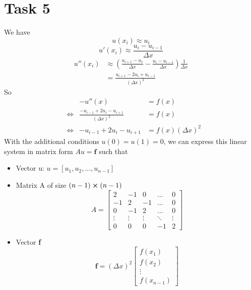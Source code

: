 \documentclass{article}
\begin{document}
\section{Task 5}
We have
$$
u(x_i) \approx u_i
$$
$$
u'(x_i) \approx \frac{u_i-u_{i-1}}{\Delta x}
$$
\begin{equation*}
    \begin{aligned}
        u''(x_i) &\approx \left(\frac{u_{i+1}-u_1}{\Delta x} - \frac{u_i-u_{i-1}}{\Delta x}\right) \frac{1}{\Delta x} \\
        &= \frac{u_{i+1}-2u_i+u_{i-1}}{(\Delta x)^2} 
    \end{aligned}
\end{equation*}
So
\begin{equation*}
    \begin{aligned}
    & &-u''(x) &= f(x) \\
    &\iff &\frac{-u_{i-1}+2u_i-u_{i+1}}{(\Delta x)^2} &= f(x) \\
    &\iff &-u_{i-1}+2u_i-u_{i+1} &= f(x)(\Delta x)^2
    \end{aligned}
\end{equation*}
With the additional conditions $u(0) = u(1) = 0$, we can express this linear system in matrix form $Au = \textbf{f}$ such that
\begin{itemize}
    \item Vector u: $u=[u_1,u_2,...,u_{n-1}]$
    \item Matrix A of size $(n-1)\cross (n-1)$
        \begin{equation*}
            A =
            \begin{bmatrix}
                2 & -1 & 0 & \dots & 0 \\
                -1 & 2 & -1 & \dots & 0 \\
                0 & -1 & 2 & \dots & 0 \\
                \vdots & \vdots & \vdots & \ddots & \vdots \\
                0 & 0 & 0 & -1 & 2
            \end{bmatrix}
        \end{equation*}
    \item Vector \textbf{f}
    \begin{equation*}
    \textbf{f} = (\Delta x)^2 
        \begin{bmatrix}
        f(x_1) \\
        f(x_2) \\
        \vdots \\
        f(x_{n-1})
        \end{bmatrix}
    \end{equation*}
\end{itemize}
\end{document}
